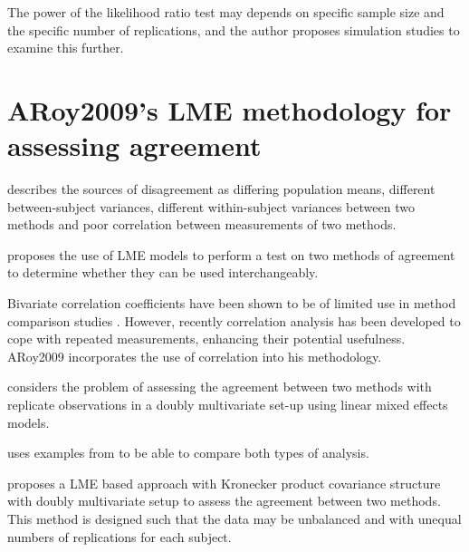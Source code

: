 \documentclass[12pt, a4paper]{report}
\theoremstyle{plain}
\theoremstyle{definition}
\theoremstyle{remark}
\begin{document}
	The power of the
	likelihood ratio test may depends on specific sample size and the
	specific number of  replications, and the author proposes
	simulation studies to examine this further.
	
	
	
	\newpage
	
	
	
	
	
	
	\section{ARoy2009's LME methodology for assessing agreement}
	
	\citet{Barnhart}  describes the sources of disagreement as
	differing population means, different between-subject variances,
	different within-subject variances between two methods and poor
	correlation between measurements of two methods.
	
	
	\citet{AARoy20092009}proposes the use of LME models to perform a test
	on two methods of agreement to determine whether they can be used
	interchangeably.
	
	Bivariate correlation coefficients have been shown to be of
	limited use in method comparison studies \citep{BA86}. However,
	recently correlation analysis has been developed to cope with
	repeated measurements, enhancing their potential usefulness. ARoy2009
	incorporates the use of correlation into his methodology.
	
	
	\citet{AARoy20092009} considers the problem of assessing the agreement
	between two methods with replicate observations in a doubly
	multivariate set-up using linear mixed effects models.
	
	
	\citet{AARoy20092009} uses examples from \citet{BA86} to be able to
	compare both types of analysis.
	
	\citet{AARoy20092009} proposes a LME based approach with Kronecker
	product covariance structure with doubly multivariate setup to
	assess the agreement between two methods. This method is designed
	such that the data may be unbalanced and with unequal numbers of
	replications for each subject.
	
\end{document}
